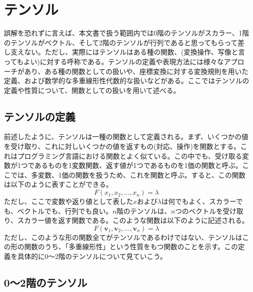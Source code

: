 \chapter{テンソル}
誤解を恐れずに言えば、本文書で扱う範囲内では0階のテンソルがスカラー、1階のテンソルがベクトル、そして2階のテンソルが行列であると思ってもらって差し支えない。ただし、実際にはテンソルはある種の関数、(変換操作、写像と言ってもよい)に対する呼称である。テンソルの定義や表現方法には様々なアプローチがあり、ある種の関数としての扱いや、座標変換に対する変換規則を用いた定義、および数学的な多重線形性代数的な扱いなどがある。ここではテンソルの定義や性質について、関数としての扱いを用いて述べる。

\section{テンソルの定義}
前述したように、テンソルは一種の関数として定義される。まず、いくつかの値を受け取り、これに対しいくつかの値を返すもの(対応、操作)を関数とする。これはプログラミング言語における関数とよく似ている。この中でも、受け取る変数が1つであるものを1変数関数、返す値が1つであるものを1価の関数と呼ぶ。ここでは、多変数、1価の関数を扱うため、これを関数と呼ぶ。すると、この関数は以下のように表すことができる。
\begin{equation}
	F(x_1,x_2, \ldots ,x_n)=\lambda
\end{equation}
ただし、ここで変数や返り値として表した\(x\)および\(\lambda\)は何でもよく、スカラーでも、ベクトルでも、行列でも良い。\(n\)階のテンソルは、\(n\)つのベクトルを受け取り、スカラー値を返す関数である。このような関数は以下のように記述される。
\begin{equation}
	F(\boldsymbol{v}_1,\boldsymbol{v}_2, \ldots ,\boldsymbol{v}_n)=\lambda
\end{equation}
ただし、このような形の関数全てがテンソルであるわけではない、テンソルはこの形の関数のうち、「多重線形性」という性質をもつ関数のことを示す。この定義を具体的に0～2階のテンソルについて見ていこう。
\section{0～2階のテンソル}
